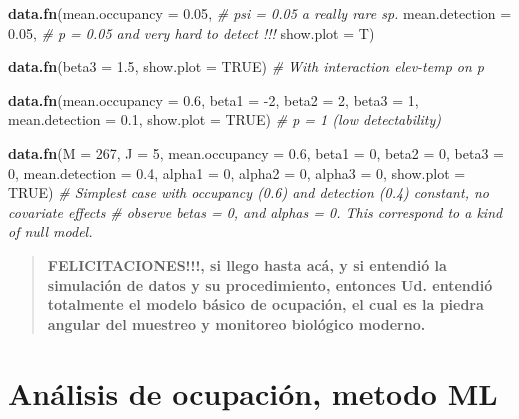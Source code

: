 \documentclass[
]{book}
\newenvironment{Shaded}{\begin{snugshade}}{\end{snugshade}}
\newcommand{\CommentTok}[1]{\textcolor[rgb]{0.56,0.35,0.01}{\textit{#1}}}
\newcommand{\DataTypeTok}[1]{\textcolor[rgb]{0.13,0.29,0.53}{#1}}
\newcommand{\DecValTok}[1]{\textcolor[rgb]{0.00,0.00,0.81}{#1}}
\newcommand{\FloatTok}[1]{\textcolor[rgb]{0.00,0.00,0.81}{#1}}
\newcommand{\KeywordTok}[1]{\textcolor[rgb]{0.13,0.29,0.53}{\textbf{#1}}}
\newcommand{\NormalTok}[1]{#1}
\newcommand{\OtherTok}[1]{\textcolor[rgb]{0.56,0.35,0.01}{#1}}
\begin{document}
\begin{Shaded}
\begin{Highlighting}[]
\KeywordTok{data.fn}\NormalTok{(}\DataTypeTok{mean.occupancy =} \FloatTok{0.05}\NormalTok{,  }\CommentTok{# psi = 0.05 a really rare sp.}
        \DataTypeTok{mean.detection =} \FloatTok{0.05}\NormalTok{,  }\CommentTok{# p = 0.05 and very hard to detect !!!}
        \DataTypeTok{show.plot =}\NormalTok{ T)}

\KeywordTok{data.fn}\NormalTok{(}\DataTypeTok{beta3 =} \FloatTok{1.5}\NormalTok{, }\DataTypeTok{show.plot =} \OtherTok{TRUE}\NormalTok{) }\CommentTok{# With interaction elev-temp on p}

\KeywordTok{data.fn}\NormalTok{(}\DataTypeTok{mean.occupancy =} \FloatTok{0.6}\NormalTok{, }\DataTypeTok{beta1 =} \DecValTok{-2}\NormalTok{, }\DataTypeTok{beta2 =} \DecValTok{2}\NormalTok{, }\DataTypeTok{beta3 =} \DecValTok{1}\NormalTok{, }
        \DataTypeTok{mean.detection =} \FloatTok{0.1}\NormalTok{, }\DataTypeTok{show.plot =} \OtherTok{TRUE}\NormalTok{)  }\CommentTok{# p = 1 (low detectability)}

\KeywordTok{data.fn}\NormalTok{(}\DataTypeTok{M =} \DecValTok{267}\NormalTok{, }\DataTypeTok{J =} \DecValTok{5}\NormalTok{, }\DataTypeTok{mean.occupancy =} \FloatTok{0.6}\NormalTok{, }\DataTypeTok{beta1 =} \DecValTok{0}\NormalTok{, }\DataTypeTok{beta2 =} \DecValTok{0}\NormalTok{, }\DataTypeTok{beta3 =} \DecValTok{0}\NormalTok{, }
        \DataTypeTok{mean.detection =} \FloatTok{0.4}\NormalTok{, }\DataTypeTok{alpha1 =} \DecValTok{0}\NormalTok{, }\DataTypeTok{alpha2 =} \DecValTok{0}\NormalTok{, }\DataTypeTok{alpha3 =} \DecValTok{0}\NormalTok{, }\DataTypeTok{show.plot =} \OtherTok{TRUE}\NormalTok{)}
\CommentTok{# Simplest case with occupancy (0.6) and detection (0.4) constant, no covariate effects}
\CommentTok{# observe betas = 0, and alphas = 0. This correspond to a kind of null model.}
\end{Highlighting}
\end{Shaded}

\begin{quote}
\textbf{FELICITACIONES!!!, si llego hasta acá, y si entendió la simulación de datos y su procedimiento, entonces Ud. entendió totalmente el modelo básico de ocupación, el cual es la piedra angular del muestreo y monitoreo biológico moderno.}
\end{quote}

\hypertarget{unmarked}{%
\chapter{Análisis de ocupación, metodo ML}\label{unmarked}}
\end{document}

